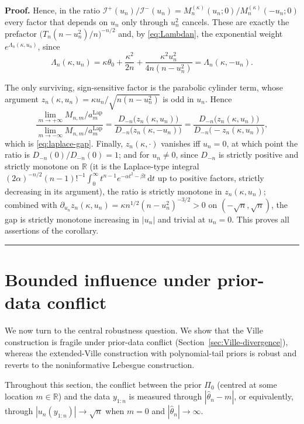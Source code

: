 \documentclass{article}%
\newenvironment{proof}[1][Proof]{\noindent\textbf{#1.} }{\ \rule{0.5em}{0.5em}}
\newcommand{\R}{\mathbb{R}}
\newcommand{\dd}{\,\mathrm{d}}
\begin{document}
\begin{proof}
Hence, in the ratio
\(\mathcal I^{+}(u_n)/\mathcal I^{-}(u_n)
=M^{(\kappa)}_n(u_n;0)/M^{(\kappa)}_n(-u_n;0)\) every factor that
depends on \(u_n\) only through \(u_n^2\) cancels. These are exactly
the prefactor \(\big(T_n(n-u_n^2)/n\big)^{-n/2}\) and, by \eqref{eq:Lambdan}, the
exponential weight \(e^{\Lambda_n(\kappa,u_n)}\), since
\[
   \Lambda_n(\kappa,u_n)
   =\kappa\theta_0+\frac{\kappa^2}{2n}
     +\frac{\kappa^2 u_n^2}{4n(n-u_n^2)}
   =\Lambda_n(\kappa,-u_n).
\]

The only surviving, sign-sensitive factor is the parabolic cylinder
term, whose argument
\(z_n(\kappa,u_n)=\kappa u_n/\sqrt{n(n-u_n^2)}\) is odd in \(u_n\).
Hence
\[
   \frac{\lim_{m\to+\infty}M_{n,m}/a_m^{\mathrm{Lap}}}
        {\lim_{m\to-\infty}M_{n,m}/a_m^{\mathrm{Lap}}}
   =\frac{D_{-n}\big(z_n(\kappa,u_n)\big)}
          {D_{-n}\big(z_n(\kappa,-u_n)\big)}
   =\frac{D_{-n}\big(z_n(\kappa,u_n)\big)}
          {D_{-n}\big(-z_n(\kappa,u_n)\big)},
\]
which is \eqref{eq:laplace-gap}. Finally, \(z_n(\kappa,\cdot)\) vanishes iff \(u_n=0\),
at which point the ratio is \(D_{-n}(0)/D_{-n}(0)=1\); and for
\(u_n\neq0\), since \(D_{-n}\) is strictly positive and strictly
monotone on \(\R\) (it is the Laplace-type integral
\((2\alpha)^{-n/2}(n-1)!^{-1}\!\int_0^\infty t^{n-1}
e^{-\alpha t^2-\beta t}\dd t\) up to positive factors, strictly
decreasing in its argument), the ratio is strictly monotone in
\(z_n(\kappa,u_n)\); combined with
\(\partial_{u_n}z_n(\kappa,u_n)=\kappa n^{1/2}
(n-u_n^2)^{-3/2}>0\) on \((-\sqrt n,\sqrt n)\), the gap is strictly
monotone increasing in \(|u_n|\) and trivial at \(u_n=0\). This
proves all assertions of the corollary.
\end{proof}





\section{Bounded influence under prior-data conflict}\label{sec:robust}

We now turn to the central robustness question. We show that the
Ville construction is fragile under prior-data conflict
(Section~\ref{sec:Ville-divergence}), whereas the extended-Ville
construction with polynomial-tail priors is robust and reverts to the
noninformative Lebesgue construction.

Throughout this section, the conflict between the prior \(\Pi_0\)
(centred at some location \(m\in\R\)) and the data \(y_{1:n}\) is
measured through \(|\widehat\theta_n-m|\), or equivalently, through
\(|u_n(y_{1:n})|\to\sqrt n\) when \(m=0\) and \(|\widehat\theta_n|\to
\infty\).
\end{document}
